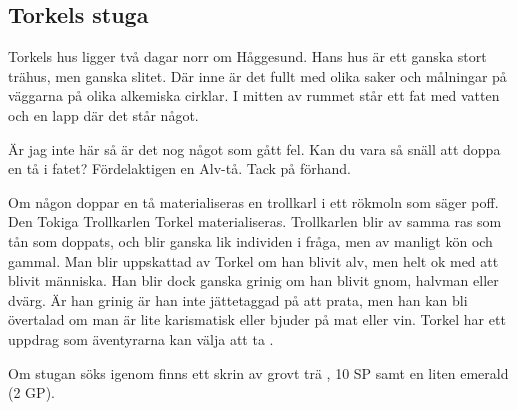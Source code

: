 \subsection{Torkels stuga}
\label{torkelsStuga}
Torkels hus ligger två dagar norr om Håggesund. Hans hus är ett ganska stort trähus, men ganska slitet. Där inne är det fullt med olika saker och målningar på väggarna på olika alkemiska cirklar.
I mitten av rummet står ett fat med vatten och en lapp där det står något.
%
\begin{displayquote}
Är jag inte här så är det nog något som gått fel. Kan du vara så snäll att doppa en tå i fatet? Fördelaktigen en Alv-tå. Tack på förhand.
\end{displayquote}
%
Om någon doppar en tå materialiseras en trollkarl i ett rökmoln som säger poff. Den Tokiga Trollkarlen Torkel materialiseras. Trollkarlen blir av samma ras som tån som doppats, och blir ganska lik individen i fråga, men av manligt kön och gammal. Man blir uppskattad av Torkel om han blivit alv, men helt ok med att blivit människa. Han blir dock ganska grinig om han blivit gnom, halvman eller dvärg. Är han grinig är han inte jättetaggad på att prata, men han kan bli övertalad om man är lite karismatisk eller bjuder på mat eller vin. Torkel har ett uppdrag som äventyrarna kan välja att ta \sectiondescribe{\ref{magikerMedRelationsproblem}}.

Om stugan söks igenom finns ett skrin av grovt trä \sectiondescribe{\ref{ladaMedRattor}}, 10 SP samt en liten emerald (2 GP).